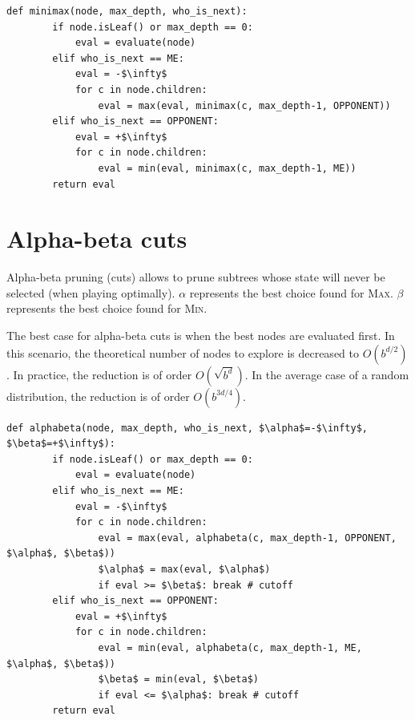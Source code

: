 \begin{algorithm}
\caption{Minimax}
\begin{lstlisting}[mathescape=true]
    def minimax(node, max_depth, who_is_next):
        if node.isLeaf() or max_depth == 0: 
            eval = evaluate(node)
        elif who_is_next == ME:
            eval = -$\infty$
            for c in node.children:
                eval = max(eval, minimax(c, max_depth-1, OPPONENT))
        elif who_is_next == OPPONENT:
            eval = +$\infty$
            for c in node.children:
                eval = min(eval, minimax(c, max_depth-1, ME))
        return eval
\end{lstlisting}
\end{algorithm}


\section{Alpha-beta cuts}
Alpha-beta pruning (cuts) allows to prune subtrees whose state will never be selected (when playing optimally).
$\alpha$ represents the best choice found for \textsc{Max}.
$\beta$ represents the best choice found for \textsc{Min}.

The best case for alpha-beta cuts is when the best nodes are evaluated first.
In this scenario, the theoretical number of nodes to explore is decreased to $O(b^{d/2})$.
In practice, the reduction is of order $O(\sqrt{b^d})$.
In the average case of a random distribution, the reduction is of order $O(b^{3d/4})$.

\begin{algorithm}
\caption{Minimax with alpha-beta cuts}
\begin{lstlisting}[mathescape=true]
    def alphabeta(node, max_depth, who_is_next, $\alpha$=-$\infty$, $\beta$=+$\infty$):
        if node.isLeaf() or max_depth == 0: 
            eval = evaluate(node)
        elif who_is_next == ME:
            eval = -$\infty$
            for c in node.children:
                eval = max(eval, alphabeta(c, max_depth-1, OPPONENT, $\alpha$, $\beta$))
                $\alpha$ = max(eval, $\alpha$)
                if eval >= $\beta$: break # cutoff
        elif who_is_next == OPPONENT:
            eval = +$\infty$
            for c in node.children:
                eval = min(eval, alphabeta(c, max_depth-1, ME, $\alpha$, $\beta$))
                $\beta$ = min(eval, $\beta$)
                if eval <= $\alpha$: break # cutoff
        return eval
\end{lstlisting}
\end{algorithm}

